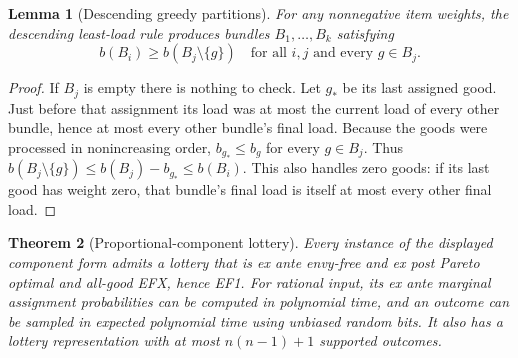 \documentclass[11pt]{article}
\newtheorem{theorem}{Theorem}
\newtheorem{lemma}[theorem]{Lemma}
\theoremstyle{definition}
\begin{document}
\begin{lemma}[Descending greedy partitions]\label{greedy}
For any nonnegative item weights, the descending least-load rule produces
bundles $B_1,\ldots,B_k$ satisfying
\[
 b(B_i)\ge b(B_j\setminus\{g\})\quad
 \text{for all }i,j\text{ and every }g\in B_j.
\]
\end{lemma}
\begin{proof}
If $B_j$ is empty there is nothing to check. Let $g_*$ be its last assigned
good. Just before that assignment its load was at most the current load
of every other bundle, hence at most every other bundle's final load.
Because the goods were processed in nonincreasing order, $b_{g_*}\le b_g$
for every $g\in B_j$. Thus
$b(B_j\setminus\{g\})\le b(B_j)-b_{g_*}\le b(B_i)$.
This also handles zero goods: if its last good has weight zero, that bundle's
final load is itself at most every other final load.
\end{proof}
\begin{theorem}[Proportional-component lottery]\label{positive}
Every instance of the displayed component form admits a lottery that is
ex ante envy-free and ex post Pareto optimal and all-good EFX, hence EF1.
For rational input, its ex ante marginal assignment
probabilities can be computed in polynomial time, and an outcome can be
sampled in expected polynomial time using unbiased random bits. It also has a lottery
representation with at most $n(n-1)+1$ supported outcomes.
\end{theorem}
\end{document}
